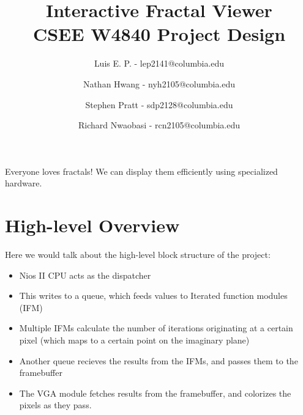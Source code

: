 \documentclass{article}
\begin{document}
\title{Interactive Fractal Viewer \\
CSEE W4840 Project Design}
\author{Luis E. P. - lep2141@columbia.edu \and
Nathan Hwang - nyh2105@columbia.edu \and
Stephen Pratt - sdp2128@columbia.edu \and
Richard Nwaobasi - rcn2105@columbia.edu}
\maketitle



Everyone loves fractals! We can display them efficiently using
specialized hardware. 


\section{High-level Overview}

Here we would talk about the high-level block structure of the project:

\begin{itemize}
\item Nios II CPU acts as the dispatcher
\item This writes to a queue, which feeds values to Iterated function
  modules (IFM)
\item Multiple IFMs calculate the number of iterations originating at
  a certain pixel (which maps to a certain point on the imaginary
  plane)
\item Another queue recieves the results from the IFMs, and passes
  them to the framebuffer
\item The VGA module fetches results from the framebuffer, and
  colorizes the pixels as they pass.
\end{itemize}




\end{document}
